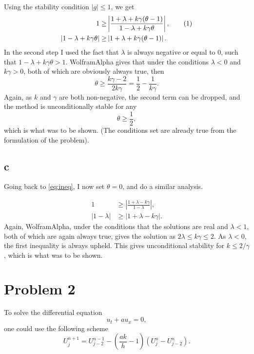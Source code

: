 \documentclass[aps, 12pt]{revtex4}
\newcommand\numberthis{\addtocounter{equation}{1}\tag{\theequation}}
\begin{document}
Using the stability condition $|g|\leq 1$, we get
\begin{align*}\label{eq:ineq}
    1\geq                                       & \left|\frac{1+\lambda +k\gamma(\theta - 1)}{1-\lambda +k\gamma\theta}\right|, \numberthis
    \\
    \left|1-\lambda +k\gamma\theta \right| \geq & \left|1+\lambda +k\gamma(\theta - 1)\right|.
\end{align*}
In the second step I used the fact that $\lambda$ is always negative or equal to $0$, such that $1-\lambda+k\gamma\theta > 1$. WolframAlpha gives that under the conditions $\lambda < 0$ and $k\gamma>0$, both of which are obviously always true, then
\begin{equation*}
    \theta \geq \frac{k\gamma-2}{2k\gamma} = \frac{1}{2} - \frac{1}{k\gamma}.
\end{equation*}
Again, as $k$ and $\gamma$ are both non-negative, the second term can be dropped, and the method is unconditionally stable for any
\begin{equation*}
    \theta \geq \frac{1}{2},
\end{equation*}
which is what was to be shown. (The conditions set are already true from the formulation of the problem).

\subsection*{c}
Going back to \eqref{eq:ineq}, I now set $\theta = 0$, and do a similar analysis.

\begin{align*}
    1           & \geq \left|\frac{1+\lambda -k\gamma}{1-\lambda}\right|,
    \\
    |1-\lambda| & \geq |1+\lambda -k\gamma|.
\end{align*}
Again, WolframAlpha, under the conditions that the solutions are real and $\lambda < 1$, both of which are again always true, gives the solution as $2\lambda \leq k\gamma \leq 2$. As $\lambda<0$, the first inequality is always upheld. This gives unconditional stability for $k\leq 2/\gamma$, which is what was to be shown.


\section*{Problem 2}
To solve the differential equation
\begin{equation*}
    u_t +au_x =0,
\end{equation*}
one could use the following scheme
\begin{equation*}
    U_j^{n+1} = U_{j-2}^{n-1}-\left(\frac{ak}{h}-1\right)(U_j^n-U_{j-2}^n).
\end{equation*}
\end{document}
